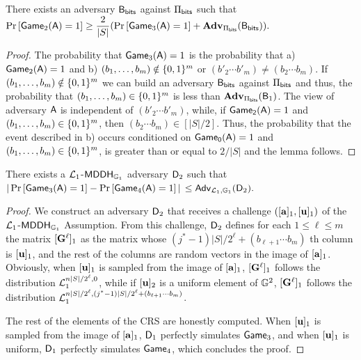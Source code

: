 \begin{lemma} There exists an adversary $\mathsf{B}_{\mathsf{bits}}$ against $\Pi_{\mathsf{bits}}$ such that
$\Pr\left[ \mathsf{Game}_2(\mathsf{A})=1\right]\geq\dfrac{2}{|S|}(\Pr\left[\mathsf{Game}_3(\mathsf{A})=1\right]+\mathbf{Adv}_{\Pi_{\mathsf{bits}}}(\mathsf{B}_{\mathsf{bits}})).$
\end{lemma}

\begin{proof}  The probability that
 $\mathsf{Game}_3(\mathsf{A})=1$ is the probability that  a) $\mathsf{Game}_2(\mathsf{A})=1$ and
b) $(b_1,\ldots,b_m)\notin\{0,1\}^m$ or $(b'_2\cdots b'_m) \neq (b_2\cdots b_m)$. If $(b_1,\ldots,b_m)\notin\{0,1\}^m$ we can build an adversary $\mathsf{B}_{\mathsf{bits}}$ against $\Pi_{\mathsf{bits}}$ and thus, the probability that $(b_1,\ldots,b_m)\in\{0,1\}^m$ is less than $\mathbf{Adv}_{\Pi_{\mathsf{bits}}}(\mathsf{B}_1)$. The view of adversary $\mathsf{A}$ is independent of $(b'_2\cdots b'_m)$, while, if $\mathsf{Game_2}(\mathsf{A})=1$ and $(b_1,\ldots,b_m)\in\{0,1\}^{m}$, then $(b_2\cdots b_m)\in[|S|/2]$. Thus, 
the probability that the event described in b) occurs conditioned on $\mathsf{Game_0}(\mathsf{A})=1$ and $(b_1,\ldots,b_m)\in\{0,1\}^{m}$, is greater than or equal to $2/|S|$ and the lemma follows.
\end{proof}

\begin{lemma} There exists a $\mathcal{L}_1$-$\mathsf{MDDH}_{\mathbb{G}_1}$ adversary $\mathsf{D}_2$ such that
$|\Pr\left[\mathsf{Game}_{3}(\mathsf{A})=1\right]\allowbreak-\Pr\left[\mathsf{Game}_{4}(\mathsf{A})=1\right]|$ $\leq
    \mathsf{Adv}_{\mathcal{L}_1,\mathbb{G}_1}(\mathsf{D}_2).$
\label{lemma:bits2}
\end{lemma}

\begin{proof}
We construct an adversary $\mathsf{D}_2$ that receives 
a challenge $([\mathbf{a}]_1,[\mathbf{u}]_1)$ of the 
$\mathcal{L}_1$-$\mathsf{MDDH}_{\mathbb{G}_1}$ Assumption. From this challenge, $\mathsf{D}_2$ defines for each $1\leq\ell\leq m$ the matrix  $[\mathbf{{G}}^\ell]_1$ as the matrix whose  $(j^*-1)|S|/2^\ell+(b_{\ell+1}\cdots b_m)$ th column is $[\mathbf{u}]_1$, and the rest of the columns are random vectors in the image of $[\mathbf{a}]_1$. 
Obviously, when $[\mathbf{u}]_1$ is sampled from 
the image of $[\mathbf{a}]_1$, $[\mathbf{{G}}^\ell]_1$ follows the distribution $\mathcal{L}_1^{n|S|/2^\ell,0}$, while if $[\mathbf{u}]_2$ is a uniform element of $\mathbb{G}^2$, $[\mathbf{{G}}^\ell]_1$ follows the distribution $\mathcal{L}_1^{n|S|/2^\ell,(j^*-1)|S|/2^\ell+(b_{\ell+1}\cdots b_m)}$. 
 
The rest of the elements of the CRS are honestly computed. When $[\mathbf{u}]_1$ is sampled from the image of $[\mathbf{{a}}]_1$, $\mathsf{D}_1$ perfectly simulates $\mathsf{Game}_3$, and when $[\mathbf{u}]_1$ is uniform, $\mathsf{D}_1$ perfectly simulates $\mathsf{Game}_4$, which concludes the proof. 

\end{proof}



